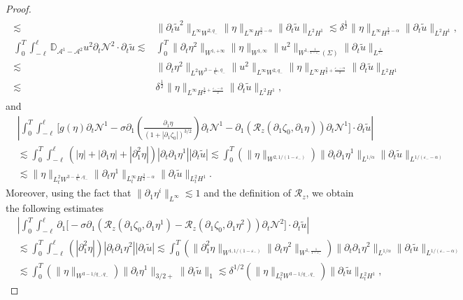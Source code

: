 \documentclass[letterpaper,reqno,10pt,twoside]{amsart}
\theoremstyle{definition}
\theoremstyle{remark}
\def\p{\partial}
\begin{document}
\begin{proof}
\begin{align}
\begin{aligned}
					\lesssim&\|\p_{t}\tilde{u}^{2}\|_{L^{\infty}W^{2,q_{-}}}\|\eta\|_{L^{\infty}H^{\frac{3}{2}-\alpha}}\|\p_{t}\tilde{u}\|_{L^{2}H^{1}}
					\lesssim\delta^{\frac{1}{2}}\|\eta\|_{L^{\infty}H^{\frac{3}{2}-\alpha}}\|\p_{t}\tilde{u}\|_{L^{2}H^{1}},\\
					\int_{0}^{T}\int_{-\ell}^{\ell}  \mathbb{D}_{\mathcal{A}^{1}-\mathcal{A}^{2}}{u}^{2}\p_{t}\mathcal{N}^{2}\cdot \p_{t}\tilde{u}\lesssim&\int_{0}^{T}\|\p_{t}\eta^{2}\|_{W^{1,+\infty}}\|\eta\|_{W^{1,\infty}}\|{u}^{2}\|_{W^{1,\frac{1}{1-\varepsilon_{-}}}(\Sigma)}\|\p_{t}\tilde{u}\|_{L^{\frac{1}{\varepsilon_{-}}}}\\
					\lesssim&\|\p_{t}\eta^{2}\|_{L^{2}W^{3-\frac{1}{q_{-}},q_-{}}}\|{u}^{2}\|_{L^{\infty}W^{2,q_{-}}}\|\eta\|_{L^{\infty}H^{\frac{3}{2}+\frac{\varepsilon_{-}-\alpha}{2}}}\|\p_{t}\tilde{u}\|_{L^{2}H^{1}}\\
					\lesssim&\delta^{\frac{1}{2}}\|\eta\|_{L^{\infty}H^{\frac{3}{2}+\frac{\varepsilon_{-}-\alpha}{2}}}\|\p_{t}\tilde{u}\|_{L^{2}H^{1}},
				\end{aligned}
			\end{align}
			\noindent and
			\begin{equation}
				\begin{aligned}
					&|\int_0^T\int_{-\ell}^\ell \bigg[ g({\eta})\p_t\mathcal{N}^1-\sigma\p_1\left(\frac{\p_1{\eta}}{(1+|\p_1\zeta_0|)^{3/2}}\right)\p_t\mathcal{N}^1-\p_{1}(\mathcal{R}_{z}(\p_{1}\zeta_{0},\p_{1}\eta))\p_{t}\mathcal{N}^{1}\bigg]\cdot\p_t\tilde{u}|\\
					&\lesssim \int_0^T\int_{-\ell}^\ell(|{\eta}|+|\p_1{\eta}|+|\p_1^2{\eta}|)|\p_t\p_1\eta^1||\p_t\tilde{u}|\lesssim \int_0^T(\|{\eta}\|_{W^{2,1/(1-\varepsilon_-)}})\|\p_t\p_1\eta^1\|_{L^{1/\alpha}}\|\p_t\tilde{u}\|_{L^{1/(\varepsilon_--\alpha)}}\\
					&\lesssim \|\eta\|_{L_{t}^{2}W^{3-\frac{1}{q_{-}},q_{-}}}\|\p_{t}\eta^{1}\|_{L_{t}^{\infty}H^{\frac{3}{2}-\alpha}}\|\p_{t}\tilde{u}\|_{L_{t}^{2}H^{1}}.
				\end{aligned}
			\end{equation}
			Moreover, using the fact that $\|\p_1\eta^i\|_{L^\infty}\lesssim1$ and the definition of $\mathcal{R}_{z}$, we obtain the following estimates
			\begin{equation}\label{est:remain_b32}
				\begin{aligned}
					&|\int_0^T\int_{-\ell}^\ell \p_{1}\bigg[-\sigma\p_1(\mathcal{R}_{z}(\p_{1}\zeta_{0},\p_{1}\eta^{1})-\mathcal{R}_{z}(\p_{1}\zeta_{0},\p_{1}\eta^{2}))\p_t\mathcal{N}^2\bigg]\cdot\p_t\tilde{u}|
					\\
					&\lesssim \int_0^T\int_{-\ell}^\ell(|\p_1^2\eta|)|\p_t\p_1\eta^2||\p_t\tilde{u}|\lesssim \int_0^T(\|\p_1^{2}\eta\|_{W^{1,1/(1-\varepsilon_-)}}\|\p_{t}\eta^{2}\|_{W^{1,\frac{1}{1-\varepsilon_{-}}}})
					\|\p_t\p_1\eta^2\|_{L^{1/\alpha}}\|\p_t\tilde{u}\|_{L^{1/(\varepsilon_--\alpha)}}\\
					&\lesssim\int_0^T (\|\eta\|_{W^{3-1/q_-,q_-}})\|\p_t\eta^1\|_{3/2+}\|\p_t\tilde{u}\|_1\lesssim \delta^{1/2}(\|\eta\|_{L_{t}^2W^{3-1/q_-,q_-}})\|\p_t\tilde{u}\|_{L_{t}^2H^1},
				\end{aligned}
			\end{equation}
			

\end{proof}
\end{document}
